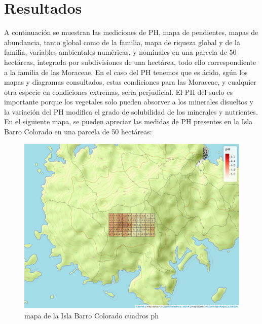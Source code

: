\documentclass[11pt,]{article}
\begin{document}
\section{Resultados}\label{resultados}

A continuación se muestran las mediciones de PH, mapa de pendientes,
mapas de abundancia, tanto global como de la familia, mapa de riqueza
global y de la familia, variables ambientales numéricas, y nominales en
una parcela de 50 hectáreas, integrada por subdivisiones de una
hectárea, todo ello correspondiente a la familia de las Moraceae. En el
caso del PH tenemos que es ácido, sgún los mapas y diagramas
consultados, estas condiciones para las Moraceae, y cualquier otra
especie en condiciones extremas, sería perjudicial. El PH del suelo es
importante porque los vegetales solo pueden absorver a los minerales
disueltos y la variación del PH modifica el grado de solubilidad de los
minerales y nutrientes. En el siguiente mapa, se pueden apreciar las
medidas de PH presentes en la Isla Barro Colorado en una parcela de 50
hectáreas:

\begin{figure}
\centering
\includegraphics[width=1.00000\textwidth]{mapa_cuadros_ph.png}
\caption{mapa de la Isla Barro Colorado cuadros ph\label{fig:bci_map}}
\end{figure}
\end{document}
